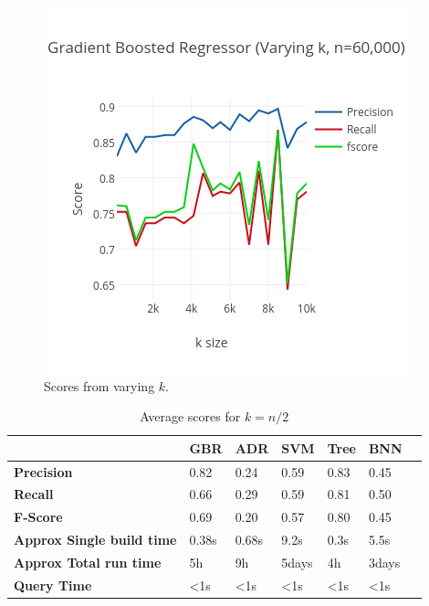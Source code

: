 \documentclass[letterpaper,11pt]{article}
\begin{document}
\begin{figure}
\centering
\includegraphics[width=0.5\linewidth]{../data_mapred/img/truncated/gbr_window_overnight.png}
\caption{Scores from varying $k$.}
\label{fig:vary_k}
\end{figure}

\begin{centering}
\begin{table}
\begin{tabular}{ | l | l | l | l | l | l | l |}
  \hline
   & \textbf{GBR}& \textbf{ADR} & \textbf{SVM} & \textbf{Tree} & \textbf{BNN}\\ \hline
  \textbf{Precision} & 0.82 & 0.24 & 0.59 & 0.83 & 0.45\\  \hline
  \textbf{Recall} & 0.66 & 0.29 & 0.59 & 0.81 & 0.50\\  \hline
  \textbf{F-Score} & 0.69 & 0.20 & 0.57 & 0.80 & 0.45\\  \hline
   \textbf{Approx Single build time} & 0.38s & 0.68s & 9.2s & 0.3s & 5.5s\\ \hline
    \textbf{Approx Total run time} & 5h & 9h & 5days & 4h & 3days\\ \hline
    \textbf{Query Time} & \textless1s & \textless1s & \textless1s & \textless1s & \textless1s\\ 
  \hline
\end{tabular}
\label{table:a}
\caption{Average scores for $k=n/2$}
\end{table}
\end{centering}
\end{document}
